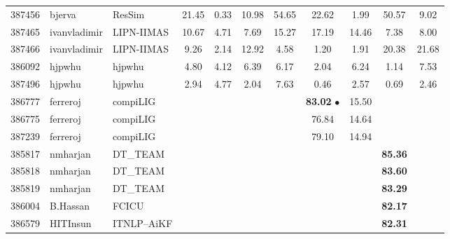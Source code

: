 \documentclass[11pt,a4paper]{article}
\begin{document}
\begin{table*}[htp!!]
\begin{center}
\begin{tabu}{|HHl| *{8}{S[table-format=2.2]|}}
387456 & bjerva & ResSim \cite{bjerva-ostling:2017:SemEval} & 21.45 & 0.33 & 10.98 & 54.65 & 22.62 & 1.99 & 50.57 & 9.02\\ 

387465 & ivanvladimir & LIPN-IIMAS \cite{arroyofernandez-mezaruiz:2017:SemEval} & 10.67 & 4.71 & 7.69 & 15.27 & 17.19 & 14.46 & 7.38 & 8.00\\ 

387466 & ivanvladimir & LIPN-IIMAS \cite{arroyofernandez-mezaruiz:2017:SemEval} & 9.26 & 2.14 & 12.92 & 4.58 & 1.20 & 1.91 & 20.38 & 21.68\\ 

386092 & hjpwhu & hjpwhu & 4.80 & 4.12 & 6.39 & 6.17 & 2.04 & 6.24 & 1.14 & 7.53\\ 

387496 & hjpwhu & hjpwhu & 2.94 & 4.77 & 2.04 & 7.63 & 0.46 & 2.57 & 0.69 & 2.46\\

386777 & ferreroj & compiLIG \cite{ferrero-EtAl:2017:SemEval}  &  &  &  &  & {\bf 83.02} $\bullet$ & 15.50 &  & \\ 

386775 & ferreroj & compiLIG \cite{ferrero-EtAl:2017:SemEval} &  &  &  &  & 76.84 & 14.64 &  & \\ 

387239 & ferreroj & compiLIG \cite{ferrero-EtAl:2017:SemEval} &  &  &  &  & 79.10 & 14.94 &  & \\

385817 & nmharjan & DT\_TEAM \cite{maharjan-EtAl:2017:SemEval} &  &  &  &  &  &  & {\bf 85.36}\hspace{0.55em} & \\ 

385818 & nmharjan & DT\_TEAM  \cite{maharjan-EtAl:2017:SemEval} &  &  &  &  &  &  & {\bf 83.60}\hspace{0.55em} & \\ 

385819 & nmharjan & DT\_TEAM  \cite{maharjan-EtAl:2017:SemEval} &  &  &  &  &  &  & {\bf 83.29}\hspace{0.55em} & \\ 

386004 & B.Hassan & FCICU \cite{hassan-EtAl:2017:SemEval} &  &  &  &  &  &  & {\bf 82.17}\hspace{0.55em} & \\ 

386579 & HITInsun & ITNLP–AiKF \cite{liu-EtAl:2017:SemEval1} &  &  &  &  &  &  & {\bf 82.31}\hspace{0.55em} & \\ 


\end{tabu}
\end{center}
\end{table*}
\end{document}
